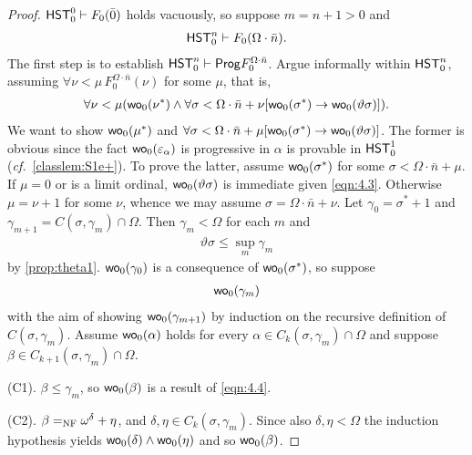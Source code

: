 \documentclass[UKenglish,cleveref,DIV=12]{scrartcl}
\theoremstyle{definition}
\theoremstyle{definition}
\begin{document}
\begin{proof}
$\mathsf{HST}_0^0\vdash F_0(\bar0)$ holds vacuously, so suppose $m=n+1>0$ and
\begin{align}\label{eqn:4.1}
\mathsf{HST}_0^n\vdash F_0(\Omega\cdot\bar n).
\end{align}
The first step is to establish
  $\mathsf{HST}_0^n\vdash\mathsf{Prog} F^{\Omega\cdot\bar n}_0$.
Argue informally within $\mathsf{HST}_0^n$, assuming $\forall\nu<\mu\, F_0^{\Omega\cdot\bar n}(\nu)$ for some $\mu$, that is,
\begin{gather}\label{eqn:4.3}
  \forall\nu<\mu(\mathsf{wo}_0(\nu^*)\land\forall\sigma<\Omega\cdot\bar n+\nu[\mathsf{wo}_0(\sigma^*)\rightarrow\mathsf{wo}_0(\vartheta\sigma)]).
\end{gather}
We want to show $\mathsf{wo}_0(\mu^*)$ and $\forall\sigma<\Omega\cdot\bar n+\mu[\mathsf{wo}_0(\sigma^*)\rightarrow\mathsf{wo}_0(\vartheta\sigma)]$. The former is obvious since the fact $\mathsf{wo}_0(\varepsilon_\alpha)$ is progressive in $\alpha$ is provable in $\mathsf{HST}_0^1$ (\emph{cf.}~\cref{classlem:S1e+}). To prove the latter, assume $\mathsf{wo}_0(\sigma^*)$ for some $\sigma<\Omega\cdot\bar n+\mu$. If $\mu=0$ or is
a limit ordinal, $\mathsf{wo}_0(\vartheta\sigma)$ is immediate given \eqref{eqn:4.3}. Otherwise $\mu=\nu+1$
for some $\nu$, whence we may assume $\sigma=\Omega\cdot\bar n+\nu$. Let
$\gamma_0=\sigma^*+1$ and $\gamma_{m+1}=C(\sigma,\gamma_m)\cap\Omega$. Then
$\gamma_m<\Omega$ for each $m$ and
\begin{align*}
  \vartheta \sigma\le\sup_{m}\gamma_m
\end{align*}
by \cref{prop:theta1}. $\mathsf{wo}_0(\gamma_0)$ is a consequence of
$\mathsf{wo}_0(\sigma^*)$, so suppose
\begin{align}\label{eqn:4.4}
 \mathsf{wo}_0(\gamma_m)
\end{align}
with the aim of showing $\mathsf{wo}_0(\gamma_{m+1})$ by induction on the recursive
definition of $C(\sigma,\gamma_m)$. Assume $\mathsf{wo}_0(\alpha)$ holds for every
$\alpha\in C_{k}(\sigma,\gamma_m)\cap\Omega$ and suppose $\beta\in
C_{k+1}(\sigma,\gamma_m)\cap\Omega$.

(C1). $\beta\le\gamma_m$, so $\mathsf{wo}_0(\beta)$ is a result of \eqref{eqn:4.4}.

(C2). $\beta=_{\mathrm{NF}}\omega^\delta+\eta$, and $\delta,\eta\in C_k(\sigma,\gamma_m)$.
Since also $\delta,\eta<\Omega$ the induction hypothesis yields
$\mathsf{wo}_0(\delta)\land\mathsf{wo}_0(\eta)$ and so $\mathsf{wo}_0(\beta)$.


\end{proof}
\end{document}
